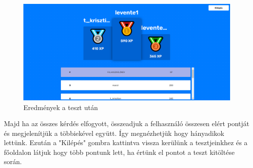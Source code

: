 \begin{figure}[H]
    \centering
    \includegraphics[width=\linewidth]{images/results.png}
    \caption{Eredmények a teszt után}
\end{figure}

Majd ha az összes kérdés elfogyott, összeadjuk a felhasználó összesen elért pontját és megjelenítjük a többiekével együtt. Így megnézhetjük hogy hányadikok lettünk. Ezután a "Kilépés" gombra kattintva vissza kerülünk a tesztjeinkhez és a főoldalon látjuk hogy több pontunk lett, ha értünk el pontot a teszt kitöltése során.